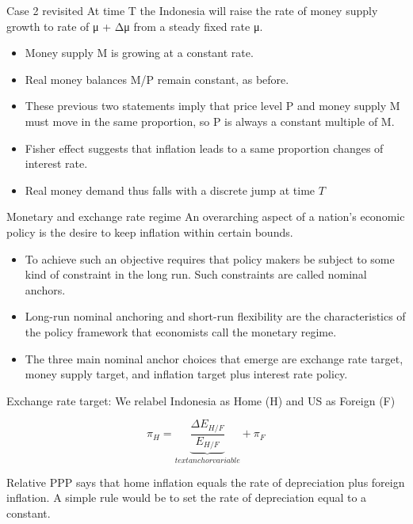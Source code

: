 \documentclass[
  ignorenonframetext,
]{beamer}
\begin{document}
\begin{frame}{Case 2 revisited}
\label{case-2-revisited}
At time T the Indonesia will raise the rate of money supply growth to
rate of μ + Δμ from a steady fixed rate μ.

\begin{itemize}
\item
  Money supply M is growing at a constant rate.
\item
  Real money balances M/P remain constant, as before.
\item
  These previous two statements imply that price level P and money
  supply M must move in the same proportion, so P is always a constant
  multiple of M.
\item
  Fisher effect suggests that inflation leads to a same proportion
  changes of interest rate.
\item
  Real money demand thus falls with a discrete jump at time \(T\)
\end{itemize}
\end{frame}

\begin{frame}{Monetary and exchange rate regime}
\label{monetary-and-exchange-rate-regime}
An overarching aspect of a nation's economic policy is the desire to
keep inflation within certain bounds.

\begin{itemize}
\item
  To achieve such an objective requires that policy makers be subject to
  some kind of constraint in the long run. Such constraints are called
  nominal anchors.
\item
  Long-run nominal anchoring and short-run flexibility are the
  characteristics of the policy framework that economists call the
  monetary regime.
\item
  The three main nominal anchor choices that emerge are exchange rate
  target, money supply target, and inflation target plus interest rate
  policy.
\end{itemize}
\end{frame}

\begin{frame}{Exchange rate target:}
\label{exchange-rate-target}
We relabel Indonesia as Home (H) and US as Foreign (F)

\begin{equation}
\pi_H=\underbrace{\frac{\Delta E_{H/F}}{E_{H/F}}}_{text{anchor variable}}+\pi_F
\end{equation}

Relative PPP says that home inflation equals the rate of depreciation
plus foreign inflation. A simple rule would be to set the rate of
depreciation equal to a constant.
\end{frame}
\end{document}
